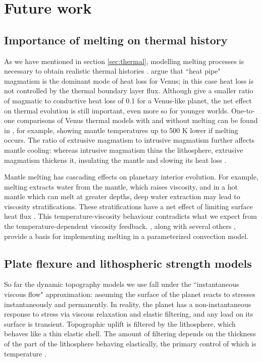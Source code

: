 \section{Future work}

\subsection{Importance of melting on thermal history}\label{sec:melting}

As we have mentioned in section \ref{sec:thermal}, modelling melting processes is necessary to obtain realistic thermal histories \citep{Nakagawa2012}. \citet{Armann2012} argue that ``heat pipe" magmatism is the dominant mode of heat loss for Venus; in this case heat loss is not controlled by the thermal boundary layer flux. Although \citet{Kite2009} give a smaller ratio of magmatic to conductive heat loss of 0.1 for a Venus-like planet, the net effect on thermal evolution is still important, even more so for younger worlds. One-to-one comparisons of Venus thermal models with and without melting can be found in \citet{Driscoll2014}, for example, showing mantle temperatures up to 500 K lower if melting occurs. The ratio of extrusive magmatism to intrusive magmatism further affects mantle cooling: whereas intrusive magmatism thins the lithosphere, extrusive magmatism thickens it, insulating the mantle and slowing its heat loss \citep{Lourenco2018}.

Mantle melting has cascading effects on planetary interior evolution. For example, melting extracts water from the mantle, which raises viscosity, and in a hot mantle which can melt at greater depths, deep water extraction may lead to viscosity stratifications. These stratifications have a net effect of limiting surface heat flux \citep{Korenaga2009}. This temperature-viscosity behaviour contradicts what we expect from the temperature-dependent viscosity feedback. \citet{Korenaga2009}, along with several others \citep{Kite2009, Driscoll2014, Tosi2017, Foley2018}, provide a basis for implementing melting in a parameterized convection model.


\subsection{Plate flexure and lithospheric strength models} \label{sec:future-elastic}

So far the dynamic topography models we use fall under the ``instantaneous viscous flow" approximation: assuming the surface of the planet reacts to stresses instantaneously and permanently. In reality, the planet has a non-instantaneous response to stress via viscous relaxation and elastic filtering, and any load on its surface is transient. Topographic uplift is filtered by the lithosphere, which behaves like a thin elastic shell. The amount of filtering depends on the thickness of the part of the lithosphere behaving elastically, the primary control of which is temperature \citep{Watts2001}.

